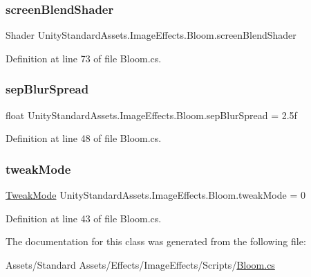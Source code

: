 \subsubsection{\texorpdfstring{screen\+Blend\+Shader}{screenBlendShader}}
{\footnotesize\ttfamily Shader Unity\+Standard\+Assets.\+Image\+Effects.\+Bloom.\+screen\+Blend\+Shader}



Definition at line 73 of file Bloom.\+cs.

\mbox{\label{class_unity_standard_assets_1_1_image_effects_1_1_bloom_a4083416b05757f931884bbdcf4e6d562}} 
\subsubsection{\texorpdfstring{sep\+Blur\+Spread}{sepBlurSpread}}
{\footnotesize\ttfamily float Unity\+Standard\+Assets.\+Image\+Effects.\+Bloom.\+sep\+Blur\+Spread = 2.\+5f}



Definition at line 48 of file Bloom.\+cs.

\mbox{\label{class_unity_standard_assets_1_1_image_effects_1_1_bloom_a1da5c25475bbf245bf480a8f7108c50e}} 
\subsubsection{\texorpdfstring{tweak\+Mode}{tweakMode}}
{\footnotesize\ttfamily \mbox{\hyperlink{class_unity_standard_assets_1_1_image_effects_1_1_bloom_a347c36b6b2157676e03ad0d9b18a27fd}{Tweak\+Mode}} Unity\+Standard\+Assets.\+Image\+Effects.\+Bloom.\+tweak\+Mode = 0}



Definition at line 43 of file Bloom.\+cs.



The documentation for this class was generated from the following file\+:\begin{DoxyCompactItemize}
\item 
Assets/\+Standard Assets/\+Effects/\+Image\+Effects/\+Scripts/\mbox{\hyperlink{_bloom_8cs}{Bloom.\+cs}}\end{DoxyCompactItemize}
